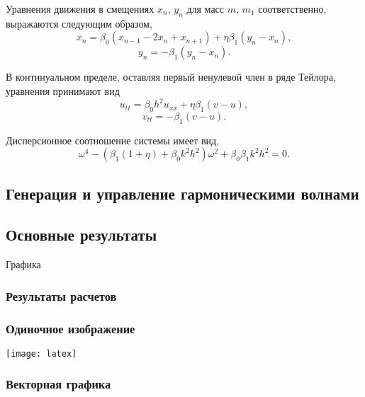 \begin{frame}
	Уравнения движения в смещениях $x_n$, $y_n$ для масс $m$, $m_1$ соответственно, выражаются следующим образом,
\begin{equation}
	\ddot{x_n}=\beta_0 (x_{n-1}-2x_n+x_{n+1})+\eta \beta_1 (y_n-x_n), 
	\label{eq1}
\end{equation}
\begin{equation}
	\ddot{y_n}=-\beta_1 (y_n-x_n).
\end{equation}

В континуальном пределе, оставляя первый ненулевой член в ряде Тейлора, уравнения принимают вид
\begin{equation}
	u_{tt}=\beta_0 h^2 u_{xx}+\eta \beta_1 (v-u), \label{eq3}
\end{equation}
\begin{equation}
	v_{tt}=-\beta_1 (v-u). \label{eq4}
\end{equation}
	
\end{frame}

\begin{frame}
	Дисперсионное соотношение системы имеет вид,
	$$
	\omega^4 -(\beta_1(1+\eta)+\beta_0 k^2 h^2)\omega^2+\beta_0 \beta_1 k^2 h^2=0.
	$$
\end{frame}

\subsection{Генерация и управление гармоническими волнами}
\subsection{Основные результаты}
\begin{frame}
    \begin{center}
        \Huge
        Графика
    \end{center}
\end{frame}

\begin{frame}
	\frametitle{Результаты расчетов}
\end{frame}

\begin{frame}
    \frametitle{Одиночное изображение}
    \centering
    \texttt{[image: latex]} %
\end{frame}

\begin{frame}
    \frametitle{Векторная графика}
    \begin{figure}
        \centering
        
    \end{figure}
\end{frame}


